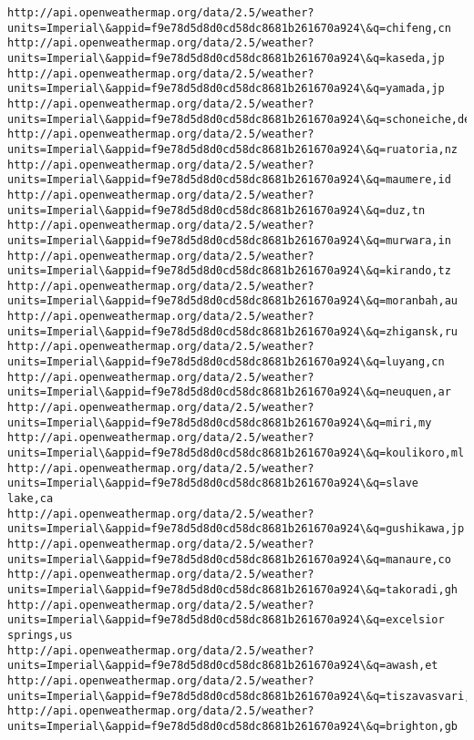 \documentclass[11pt]{article}
\begin{document}
\begin{Verbatim}[commandchars=\\\{\}]
http://api.openweathermap.org/data/2.5/weather?units=Imperial\&appid=f9e78d5d8d0cd58dc8681b261670a924\&q=chifeng,cn
http://api.openweathermap.org/data/2.5/weather?units=Imperial\&appid=f9e78d5d8d0cd58dc8681b261670a924\&q=kaseda,jp
http://api.openweathermap.org/data/2.5/weather?units=Imperial\&appid=f9e78d5d8d0cd58dc8681b261670a924\&q=yamada,jp
http://api.openweathermap.org/data/2.5/weather?units=Imperial\&appid=f9e78d5d8d0cd58dc8681b261670a924\&q=schoneiche,de
http://api.openweathermap.org/data/2.5/weather?units=Imperial\&appid=f9e78d5d8d0cd58dc8681b261670a924\&q=ruatoria,nz
http://api.openweathermap.org/data/2.5/weather?units=Imperial\&appid=f9e78d5d8d0cd58dc8681b261670a924\&q=maumere,id
http://api.openweathermap.org/data/2.5/weather?units=Imperial\&appid=f9e78d5d8d0cd58dc8681b261670a924\&q=duz,tn
http://api.openweathermap.org/data/2.5/weather?units=Imperial\&appid=f9e78d5d8d0cd58dc8681b261670a924\&q=murwara,in
http://api.openweathermap.org/data/2.5/weather?units=Imperial\&appid=f9e78d5d8d0cd58dc8681b261670a924\&q=kirando,tz
http://api.openweathermap.org/data/2.5/weather?units=Imperial\&appid=f9e78d5d8d0cd58dc8681b261670a924\&q=moranbah,au
http://api.openweathermap.org/data/2.5/weather?units=Imperial\&appid=f9e78d5d8d0cd58dc8681b261670a924\&q=zhigansk,ru
http://api.openweathermap.org/data/2.5/weather?units=Imperial\&appid=f9e78d5d8d0cd58dc8681b261670a924\&q=luyang,cn
http://api.openweathermap.org/data/2.5/weather?units=Imperial\&appid=f9e78d5d8d0cd58dc8681b261670a924\&q=neuquen,ar
http://api.openweathermap.org/data/2.5/weather?units=Imperial\&appid=f9e78d5d8d0cd58dc8681b261670a924\&q=miri,my
http://api.openweathermap.org/data/2.5/weather?units=Imperial\&appid=f9e78d5d8d0cd58dc8681b261670a924\&q=koulikoro,ml
http://api.openweathermap.org/data/2.5/weather?units=Imperial\&appid=f9e78d5d8d0cd58dc8681b261670a924\&q=slave lake,ca
http://api.openweathermap.org/data/2.5/weather?units=Imperial\&appid=f9e78d5d8d0cd58dc8681b261670a924\&q=gushikawa,jp
http://api.openweathermap.org/data/2.5/weather?units=Imperial\&appid=f9e78d5d8d0cd58dc8681b261670a924\&q=manaure,co
http://api.openweathermap.org/data/2.5/weather?units=Imperial\&appid=f9e78d5d8d0cd58dc8681b261670a924\&q=takoradi,gh
http://api.openweathermap.org/data/2.5/weather?units=Imperial\&appid=f9e78d5d8d0cd58dc8681b261670a924\&q=excelsior springs,us
http://api.openweathermap.org/data/2.5/weather?units=Imperial\&appid=f9e78d5d8d0cd58dc8681b261670a924\&q=awash,et
http://api.openweathermap.org/data/2.5/weather?units=Imperial\&appid=f9e78d5d8d0cd58dc8681b261670a924\&q=tiszavasvari,hu
http://api.openweathermap.org/data/2.5/weather?units=Imperial\&appid=f9e78d5d8d0cd58dc8681b261670a924\&q=brighton,gb

\end{Verbatim}
\end{document}
